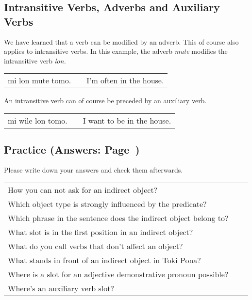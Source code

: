 %
%
\subsection*{Intransitive Verbs, Adverbs and Auxiliary Verbs}
%
%

We have learned that a verb can be modified by an adverb.
This of course also applies to intransitive verbs. 
In this example, the adverb \textit{mute} modifies the intransitive verb \textit{lon.}

\begin{supertabular}{p{5,5cm}|ll}
mi lon mute tomo. && I'm often in the house. \\
\end{supertabular} 

An intransitive verb can of course be preceded by an auxiliary verb.

\begin{supertabular}{p{5,5cm}|ll}
mi wile lon tomo. && I want to be in the house. \\
\end{supertabular} 

%
\newpage
%
\subsection*{Practice (Answers: Page~\pageref{'indirect_objects'})}
%
Please write down your answers and check them afterwards. 

\begin{supertabular}{p{5,5cm}|ll}
How you can not ask for an indirect object? &&  \\ %
Which object type is strongly influenced by the predicate? &&   \\ %
Which phrase in the sentence does the indirect object belong to? &&  \\ %
What slot is in the first position in an indirect object? &&  \\ %
What do you call verbs that don't affect an object? &&  \\ %
What stands in front of an indirect object in Toki Pona? &&  \\ %
Where is a slot for an adjective demonstrative pronoun possible? &&  \\ %
Where's an auxiliary verb slot? &&  \\ %
\end{supertabular}


